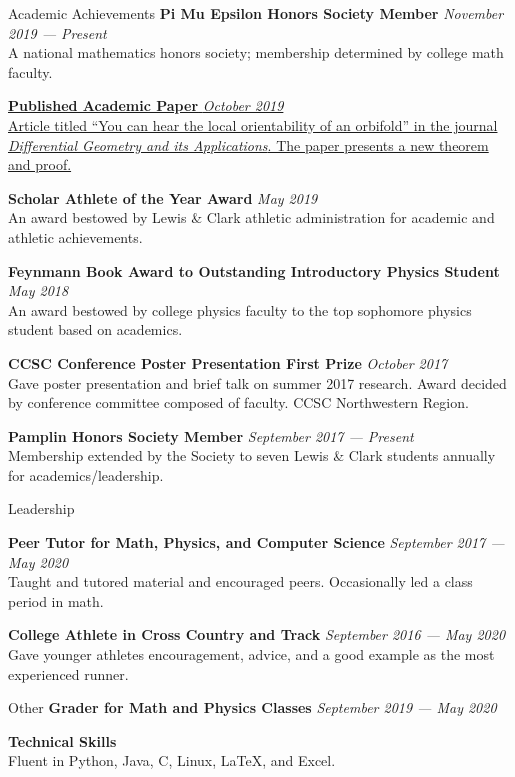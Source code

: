 \documentclass{resume}
\begin{document}
\begin{rSection}{Academic Achievements} 
    \textbf{Pi Mu Epsilon Honors Society Member} \hfill \textit{November 2019 --- Present}\\
 A national mathematics honors society; membership determined by college math faculty.

    \href{https://www.sciencedirect.com/science/article/pii/S092622451930097X?utm_campaign=STMJ_75273_AUTH_SERV_PPUB&utm_medium=email&utm_dgroup=Email1Publishing&utm_acid=-800555120&SIS_ID=-1&dgcid=STMJ_75273_AUTH_SERV_PPUB&CMX_ID=&utm_in=DM597592&utm_source=AC_30}
	{\textbf{Published Academic Paper} \hfill \textit{October 2019} \\
Article titled ``You can hear the local orientability of an orbifold'' in the journal \textit{Differential Geometry and its Applications}. The paper presents a new theorem and proof.}

    \textbf{Scholar Athlete of the Year Award} \hfill \textit{May 2019}\\ 
An award bestowed by Lewis \& Clark athletic administration for academic and athletic achievements.

    \textbf{Feynmann Book Award to Outstanding Introductory Physics Student}
	\hfill \textit{May 2018}\\
    An award bestowed by college physics faculty to the top sophomore physics student based on academics.

    \textbf{CCSC Conference Poster Presentation First Prize} \hfill \textit{October 2017}\\
    Gave poster presentation and brief talk on summer 2017 research. Award decided by conference committee composed of faculty. CCSC Northwestern Region.

    \textbf{Pamplin Honors Society Member} \hfill \textit{September 2017 --- Present} \\
 Membership extended by the Society to seven Lewis \& Clark students annually for academics/leadership.

\end{rSection}

\begin{rSection}{Leadership}

    \textbf{Peer Tutor for Math, Physics, and Computer Science} \hfill \textit{September 2017 --- May 2020}\\
    Taught and tutored material and encouraged peers. Occasionally led a class period in math.

    \textbf{College Athlete in Cross Country and Track} \hfill \textit{September 2016 --- May 2020} \\
    Gave younger athletes encouragement, advice, and a good example as the most experienced runner.

\end{rSection}

\begin{rSection}{Other}
    \textbf{Grader for Math and Physics Classes} \hfill \textit{September 2019 --- May 2020}

    \textbf{Technical Skills}\\
    Fluent in Python, Java, C, Linux, LaTeX, and Excel.
\end{rSection}
\end{document}
